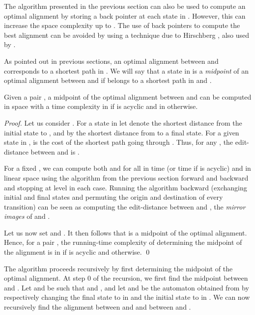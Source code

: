 \documentclass{llncs}
\newcommand{\0}{\overline{0}}
\newcommand{\1}{\overline{1}}
\newcommand{\+}{\oplus}
\renewcommand{\.}{\otimes}
\begin{document}
The algorithm presented in the previous section can also be used to
compute an optimal alignment by storing a back pointer at each state
in . However, this can increase the space complexity up to .  The use of back pointers to compute the best alignment can
be avoided by using a technique due to Hirschberg \cite{hirschberg},
also used by \cite{myers-miller88,myers-miller89}.

As pointed out in previous sections, an optimal alignment between 
and  corresponds to a shortest path in .
We will say that a state  in  is a {\em midpoint} of an optimal
alignment between  and  if  belongs to a shortest path in
 and .

\begin{lemma}
Given a pair , a midpoint of the optimal alignment between 
and  can be computed in  space with a time complexity in
 if  is acyclic and in 
otherwise.
\end{lemma}
\begin{proof}
  Let us consider . For a state  in  let
   denote the shortest distance from the initial state to ,
  and by  the shortest distance from  to a final state.
  For a given state  in ,  is the
  cost of the shortest path going through .  Thus, for any ,
  the edit-distance between  and  is .

  For a fixed , we can compute both  and
   for all  in  time (or
   time if  is acyclic) and in linear space 
  using the algorithm from the previous section forward and backward
  and stopping at level  in each case. Running the algorithm
  backward (exchanging initial and final states and permuting the
  origin and destination of every transition) can be seen as computing
  the edit-distance between  and , the {\em mirror images}
  of  and .
 
  Let us now set  and . It then follows that  is a midpoint of
  the optimal alignment. Hence, for a pair , the running-time
  complexity of determining the midpoint of the alignment is in  if  is acyclic and  otherwise. \qed
\end{proof}

The algorithm proceeds recursively by first determining the midpoint
of the optimal alignment.  At step 0 of the recursion, we first find
the midpoint  between  and . Let  and  be
such that  and , and let  and  be
the automaton obtained from  by respectively changing the final
state to  in  and the initial state to  in . We
can now recursively find the alignment between  and  and
between  and .
\end{document}
